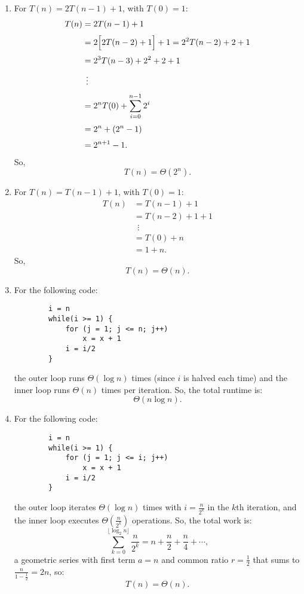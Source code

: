 \documentclass[11pt]{article}
\begin{document}
\begin{enumerate}
    \item For \(T(n) = 2T(n-1) + 1\), with \(T(0)=1\):
    \[
    \begin{aligned}
    T(n) &= 2T(n-1) + 1\\[1mm]
         &= 2\Bigl[2T(n-2) + 1\Bigr] + 1 = 2^2 T(n-2) + 2 + 1\\[1mm]
         &= 2^3 T(n-3) + 2^2 + 2 + 1\\[1mm]
         &\;\,\vdots\\[1mm]
         &= 2^nT(0) + \sum_{i=0}^{n-1} 2^i\\[1mm]
         &= 2^n + \left(2^n - 1\right)\\[1mm]
         &= 2^{n+1} - 1.
    \end{aligned}
    \]
    So, 
    {\boldmath\[
    T(n) = \Theta(2^n).
    \]}
    
    \item For \(T(n) = T(n-1) + 1\), with \(T(0)=1\):
    \[
    \begin{aligned}
    T(n) &= T(n-1) + 1\\[1mm]
         &= T(n-2) + 1 + 1\\[1mm]
         &\;\,\vdots\\[1mm]
         &= T(0) + n\\[1mm]
         &= 1 + n.
    \end{aligned}
    \]
    So, 
    {\boldmath\[
    T(n) = \Theta(n).
    \]}
    
    \item For the following code:
    \begin{verbatim}
        i = n
        while(i >= 1) {
            for (j = 1; j <= n; j++)
                x = x + 1
            i = i/2
        }
    \end{verbatim}
    the outer loop runs \(\Theta(\log n)\) times (since \(i\) is halved each time) and the inner loop runs \(\Theta(n)\) times per iteration. So, the total runtime is:
    {\boldmath\[
    \Theta(n \log n).
    \]}
    
    \item For the following code:
    \begin{verbatim}
        i = n
        while(i >= 1) {
            for (j = 1; j <= i; j++)
                x = x + 1
            i = i/2
        }
    \end{verbatim}
the outer loop iterates \(\Theta(\log n)\) times with \(i = \frac{n}{2^k}\) in the \(k\)th iteration, and the inner loop executes \(\Theta\left(\frac{n}{2^k}\right)\) operations. So, the total work is:
\[
\sum_{k=0}^{\lfloor \log_2 n \rfloor} \frac{n}{2^k} = n + \frac{n}{2} + \frac{n}{4} + \cdots,
\]
a geometric series with first term \(a=n\) and common ratio \(r=\frac{1}{2}\) that sums to \(\frac{n}{1-\frac{1}{2}} = 2n\), so:
    {\boldmath\[
    T(n) = \Theta(n).
    \]}
\end{enumerate}
\end{document}
